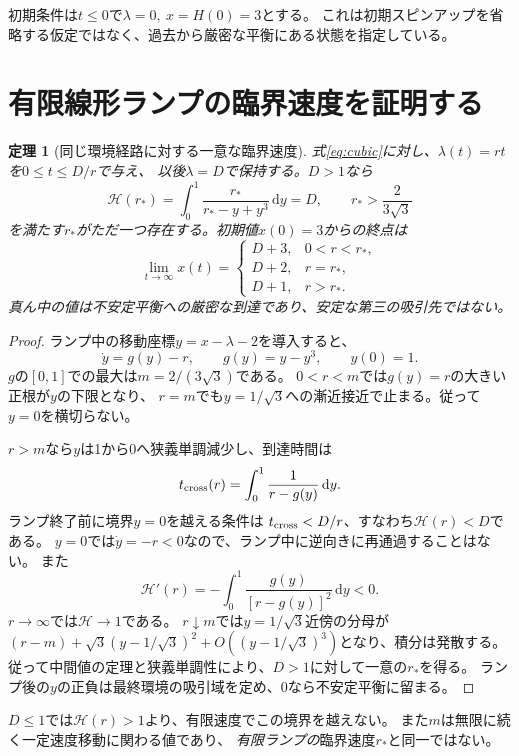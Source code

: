 \documentclass[a4paper,11pt]{ltjsarticle}
\newtheorem{theorem}[proposition]{定理}
\newcommand{\dd}{\mathrm d}
\begin{document}
初期条件は$t\le0$で$\lambda=0,\ x=H(0)=3$とする。
これは初期スピンアップを省略する仮定ではなく、過去から厳密な平衡にある状態を指定している。

\section{有限線形ランプの臨界速度を証明する}
\begin{theorem}[同じ環境経路に対する一意な臨界速度]
式\eqref{eq:cubic}に対し、$\lambda(t)=rt$を$0\le t\le D/r$で与え、
以後$\lambda=D$で保持する。$D>1$なら
\begin{equation}
\mathcal H(r_*)=
\int_0^1\frac{r_*}{r_*-y+y^3}\,\dd y=D,\qquad
r_*>\frac{2}{3\sqrt3}
\label{eq:critical}
\end{equation}
を満たす$r_*$がただ一つ存在する。初期値$x(0)=3$からの終点は
\[
\lim_{t\to\infty}x(t)=
\begin{cases}
D+3,&0<r<r_*,\\
D+2,&r=r_*,\\
D+1,&r>r_*.
\end{cases}
\]
真ん中の値は不安定平衡への厳密な到達であり、安定な第三の吸引先ではない。
\end{theorem}
\begin{proof}
ランプ中の移動座標$y=x-\lambda-2$を導入すると、
\begin{equation}
\dot y=g(y)-r,\qquad g(y)=y-y^3,\qquad y(0)=1.
\end{equation}
$g$の$[0,1]$での最大は$m=2/(3\sqrt3)$である。
$0<r<m$では$g(y)=r$の大きい正根が$y$の下限となり、
$r=m$でも$y=1/\sqrt3$への漸近接近で止まる。従って$y=0$を横切らない。

$r>m$なら$y$は1から0へ狭義単調減少し、到達時間は
\[
t_{\rm cross}(r)=\int_0^1\frac{1}{r-g(y)}\,\dd y.
\]
ランプ終了前に境界$y=0$を越える条件は
$t_{\rm cross}<D/r$、すなわち$\mathcal H(r)<D$である。
$y=0$では$\dot y=-r<0$なので、ランプ中に逆向きに再通過することはない。
また
\[
\mathcal H'(r)=-\int_0^1\frac{g(y)}{[r-g(y)]^2}\,\dd y<0.
\]
$r\to\infty$では$\mathcal H\to1$である。
$r\downarrow m$では$y=1/\sqrt3$近傍の分母が
$(r-m)+\sqrt3(y-1/\sqrt3)^2+O((y-1/\sqrt3)^3)$となり、積分は発散する。
従って中間値の定理と狭義単調性により、$D>1$に対して一意の$r_*$を得る。
ランプ後の$y$の正負は最終環境の吸引域を定め、0なら不安定平衡に留まる。
\end{proof}

$D\le1$では$\mathcal H(r)>1$より、有限速度でこの境界を越えない。
また$m$は無限に続く一定速度移動に関わる値であり、
\emph{有限ランプの}臨界速度$r_*$と同一ではない。
\end{document}
